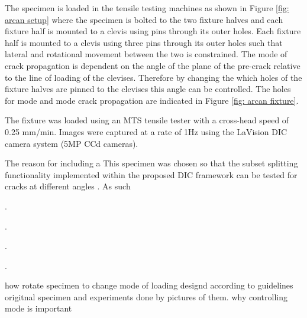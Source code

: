 \documentclass[12pt,oneside,openany,a4paper, %
english, %
masters-t, goldenblock]{usthesis}
\newcommand{\RomanNumeralCaps}[1]
    {\MakeUppercase{\romannumeral #1}}
\begin{document}
The specimen is loaded in the tensile testing machines as shown in Figure \ref{fig: arcan setup} where the specimen is bolted to the two fixture halves and each fixture half is mounted to a clevis using pins through its outer holes. Each fixture half is mounted to a clevis using three pins through its outer holes such that lateral and rotational movement between the two is constrained. The mode of crack propagation is dependent on the angle of the plane of the pre-crack relative to the line of loading of the clevises. Therefore by changing the which holes of the fixture halves are pinned to the clevises this angle can be controlled. The holes for mode \RomanNumeralCaps{1} and mode \RomanNumeralCaps{2} crack propagation are indicated in Figure \ref{fig: arcan fixture}.

The fixture was loaded using an MTS tensile tester with a cross-head speed of 0.25 mm/min. Images were captured at a rate of 1Hz using the LaVision DIC camera system (5MP CCd cameras). 

The reason for including a 
This specimen was chosen so that the subset splitting functionality implemented within the proposed DIC framework can be tested for cracks at different angles . As such 





.

.

.

.



how rotate specimen to change mode of loading
designd according to guidelines
origitnal specimen and experiments done by
pictures of them.
why controlling mode is important






\end{document}
